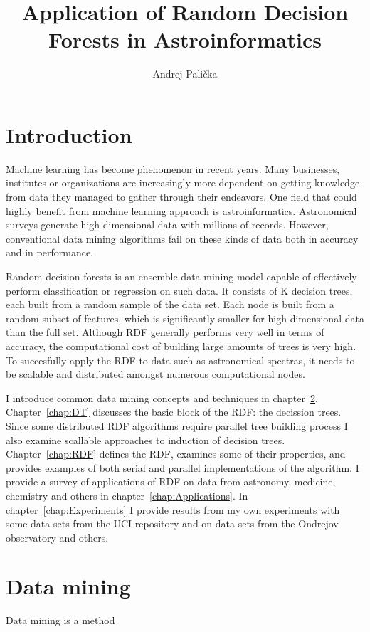 \documentclass[thesis=B,english]{FITthesis}[2012/10/20]
\title{Application of Random Decision Forests in Astroinformatics}
\author{Andrej Pali{\v c}ka} %
\begin{document}

\chapter{Introduction}
Machine learning has become phenomenon in recent years. Many businesses, institutes or organizations are increasingly more dependent on getting knowledge from data they managed to gather through their endeavors. One field that could highly benefit from machine learning approach is astroinformatics.  Astronomical surveys generate high dimensional data with millions of records. However, conventional data mining algorithms fail on these kinds of data both in accuracy and in performance. 

Random decision forests \cite{BR01} is an ensemble data mining model capable of effectively perform classification or regression on such data. It consists of K decision trees, each built from a random sample of the data set. Each node is built from a random subset of features, which is significantly smaller for high dimensional data than the full set. Although RDF generally performs very well in terms of accuracy, the computational cost of building large amounts of trees is very high. To succesfully apply the RDF to data such as astronomical spectras, it needs to be scalable and distributed amongst numerous computational nodes.

I introduce common data mining concepts and techniques in chapter~\ref{chap:DM}. Chapter~\ref{chap:DT} discusses the basic block of the RDF: the decission trees. Since some distributed RDF algorithms require parallel tree building process I also examine scallable approaches to induction of decision trees. Chapter~\ref{chap:RDF} defines the RDF, examines some of their properties, and provides examples of both serial and parallel implementations of the algorithm. I provide a survey of applications of RDF on data from astronomy, medicine, chemistry and others in chapter~\ref{chap:Applications}. In chapter~\ref{chap:Experiments} I provide results from my own experiments with some data sets from the UCI repository and on data sets from the Ondrejov observatory and others. 
\chapter{Data mining}
\label{chap:DM}
Data mining is a method 
\end{document}
